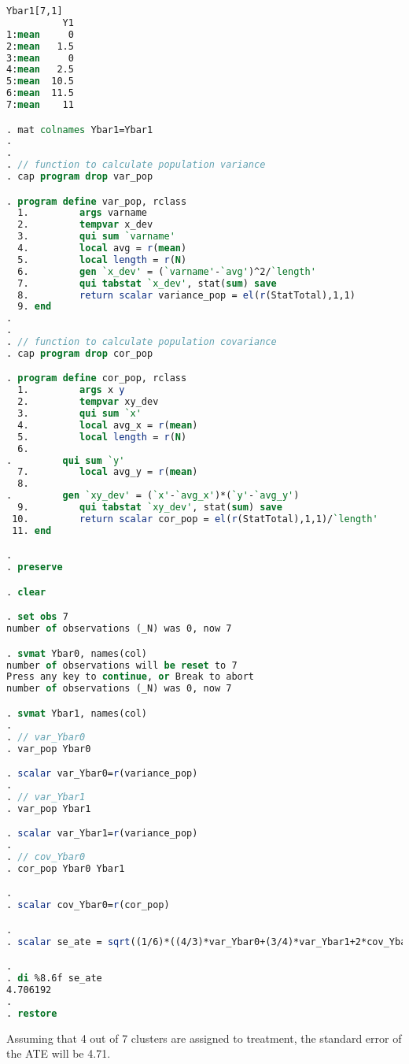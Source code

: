 \documentclass[11pt,notitlepage]{article}\usepackage[]{graphicx}\usepackage[]{color}
\begin{document}
\begin{enumerate}[a)]
\begin{lstlisting}[language=stata]
Ybar1[7,1]
          Y1
1:mean     0
2:mean   1.5
3:mean     0
4:mean   2.5
5:mean  10.5
6:mean  11.5
7:mean    11

. mat colnames Ybar1=Ybar1 
. 
. 
. // function to calculate population variance
. cap program drop var_pop

. program define var_pop, rclass
  1.         args varname    
  2.         tempvar x_dev 
  3.         qui sum `varname'
  4.         local avg = r(mean)
  5.         local length = r(N)     
  6.         gen `x_dev' = (`varname'-`avg')^2/`length'
  7.         qui tabstat `x_dev', stat(sum) save
  8.         return scalar variance_pop = el(r(StatTotal),1,1)
  9. end
. 
. 
. // function to calculate population covariance
. cap program drop cor_pop

. program define cor_pop, rclass
  1.         args x y        
  2.         tempvar xy_dev 
  3.         qui sum `x'
  4.         local avg_x = r(mean)
  5.         local length = r(N)     
  6.         
.         qui sum `y'
  7.         local avg_y = r(mean)
  8.                 
.         gen `xy_dev' = (`x'-`avg_x')*(`y'-`avg_y')
  9.         qui tabstat `xy_dev', stat(sum) save
 10.         return scalar cor_pop = el(r(StatTotal),1,1)/`length'
 11. end

. 
. preserve 

. clear

. set obs 7
number of observations (_N) was 0, now 7

. svmat Ybar0, names(col)
number of observations will be reset to 7
Press any key to continue, or Break to abort
number of observations (_N) was 0, now 7

. svmat Ybar1, names(col)
. 
. // var_Ybar0    
. var_pop Ybar0

. scalar var_Ybar0=r(variance_pop)
. 
. // var_Ybar1 
. var_pop Ybar1

. scalar var_Ybar1=r(variance_pop)
. 
. // cov_Ybar0 
. cor_pop Ybar0 Ybar1

. 
. scalar cov_Ybar0=r(cor_pop)

. 
. scalar se_ate = sqrt((1/6)*((4/3)*var_Ybar0+(3/4)*var_Ybar1+2*cov_Ybar0))

. 
. di %8.6f se_ate
4.706192
. 
. restore
\end{lstlisting}







Assuming that 4 out of 7 clusters are assigned to treatment, the standard error of the ATE will be 4.71.


\end{enumerate}
\end{document}
